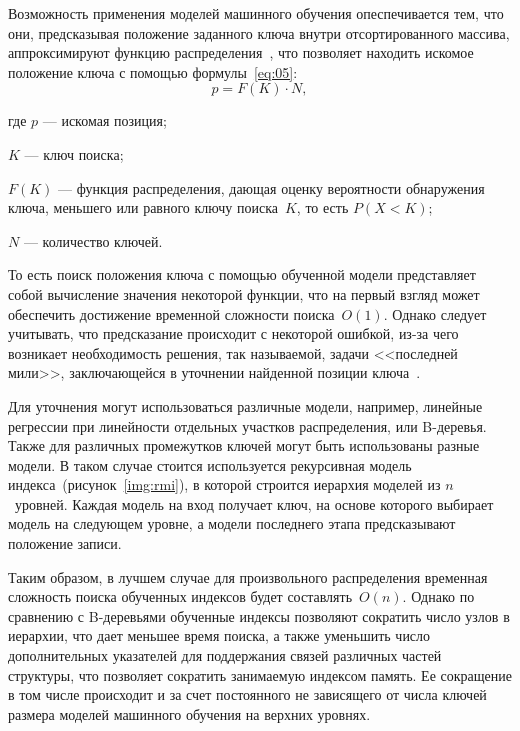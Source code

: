 
Возможность применения моделей машинного обучения опеспечивается тем, что они,
предсказывая положение заданного ключа внутри отсортированного массива,
аппроксимируют функцию распределения~\cite{main}, что позволяет находить искомое
положение ключа с помощью формулы~\eqref{eq:05}:
\begin{equation}\label{eq:05}
    p = F(K) \cdot N,
\end{equation}

где $p$ --- искомая позиция;

$K$ --- ключ поиска;

$F(K)$ --- функция распределения, дающая оценку вероятности обнаружения
ключа, меньшего или равного ключу поиска~$K$, то есть $P(X < K)$;

$N$ --- количество ключей.

То есть поиск положения ключа с помощью обученной модели представляет собой
вычисление значения некоторой функции, что на первый взгляд может обеспечить
достижение временной сложности поиска~$O(1)$. Однако следует
учитывать, что предсказание происходит с некоторой ошибкой, из-за чего возникает
необходимость решения, так называемой, задачи <<последней мили>>, заключающейся
в уточнении найденной позиции ключа~\cite{main}.

Для уточнения могут использоваться различные модели, например, линейные
регрессии при линейности отдельных участков распределения, или B-деревья. Также
для различных промежутков ключей могут быть использованы разные модели. В таком
случае стоится используется рекурсивная модель индекса~(рисунок~\ref{img:rmi}),
в которой строится иерархия моделей из $n$~уровней. Каждая модель на вход
получает ключ, на основе которого выбирает модель на следующем уровне, а модели
последнего этапа предсказывают положение записи.


Таким образом, в лучшем случае для произвольного распределения временная
сложность поиска обученных индексов будет составлять~$O(n)$.  Однако по
сравнению с B-деревьями обученные индексы позволяют сократить число узлов в
иерархии, что дает меньшее время поиска, а также уменьшить число дополнительных
указателей для поддержания связей различных частей структуры, что позволяет
сократить занимаемую индексом память. Ее сокращение в том числе происходит и за
счет постоянного не зависящего от числа ключей размера моделей машинного
обучения на верхних уровнях.

